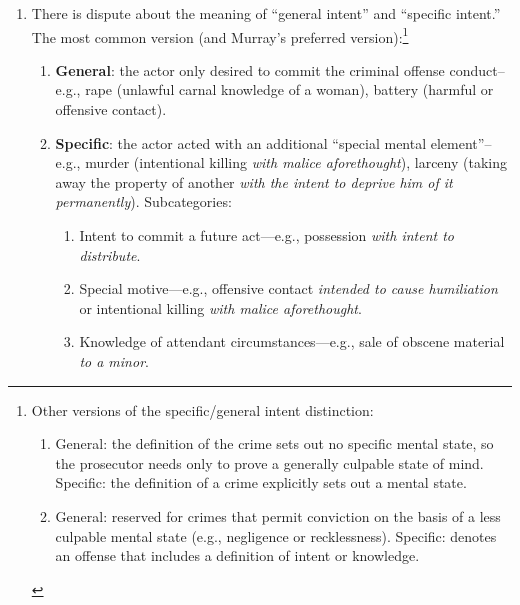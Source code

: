 \begin{enumerate}
    \item There is dispute about the meaning of ``general intent'' and 
    ``specific intent.'' The most common version (and Murray's preferred 
    version):\footnote{Other versions of the specific/general intent 
    distinction:
    \begin{enumerate}
        \item General: the definition of the crime sets out no specific mental 
        state, so the prosecutor needs only to prove a generally culpable 
        state of mind. Specific: the definition of a crime explicitly sets out 
        a mental state.
        \item General: reserved for crimes that permit conviction on the basis 
        of a less culpable mental state (e.g., negligence or recklessness).  
        Specific: denotes an offense that includes a definition of intent or 
        knowledge.
    \end{enumerate}}
    \begin{enumerate}
        \item \textbf{General}: the actor only desired to commit the criminal 
        offense conduct--e.g., rape (unlawful carnal knowledge of a woman), 
        battery (harmful or offensive contact).
        \item \textbf{Specific}: the actor acted with an additional ``special 
        mental element''--e.g., murder (intentional killing \emph{with malice 
        aforethought}), larceny (taking away the property of another 
        \emph{with the intent to deprive him of it permanently}). 
        Subcategories:
        \begin{enumerate}
            \item Intent to commit a future act---e.g., possession \emph{with 
            intent to distribute}.
            \item Special motive---e.g., offensive contact \emph{intended to 
            cause humiliation} or intentional killing \emph{with malice 
            aforethought}.
            \item Knowledge of attendant circumstances---e.g., sale of obscene 
            material \emph{to a minor}.
        \end{enumerate}
    \end{enumerate}
\end{enumerate}


